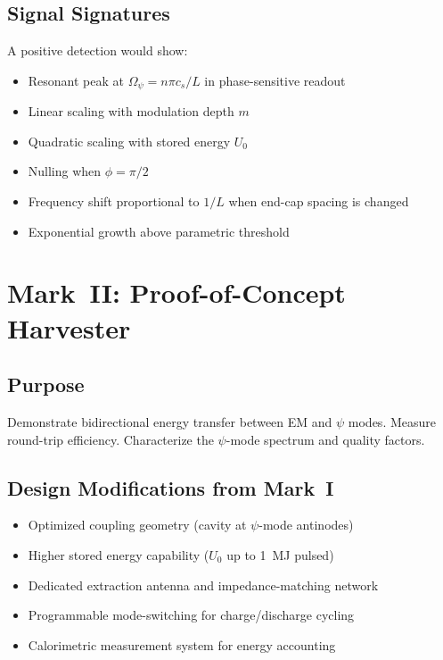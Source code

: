 \documentclass[11pt,a4paper]{article}
\begin{document}
\subsection{Signal Signatures}

A positive detection would show:
\begin{itemize}
\item Resonant peak at $\Omega_\psi = n\pi c_s/L$ in phase-sensitive readout
\item Linear scaling with modulation depth $m$
\item Quadratic scaling with stored energy $U_0$
\item Nulling when $\phi = \pi/2$
\item Frequency shift proportional to $1/L$ when end-cap spacing is changed
\item Exponential growth above parametric threshold
\end{itemize}

\section{Mark~II: Proof-of-Concept Harvester}

\subsection{Purpose}

Demonstrate bidirectional energy transfer between EM and $\psi$ modes.
Measure round-trip efficiency.  Characterize the $\psi$-mode spectrum
and quality factors.

\subsection{Design Modifications from Mark~I}

\begin{itemize}
\item Optimized coupling geometry (cavity at $\psi$-mode antinodes)
\item Higher stored energy capability ($U_0$ up to 1~MJ pulsed)
\item Dedicated extraction antenna and impedance-matching network
\item Programmable mode-switching for charge/discharge cycling
\item Calorimetric measurement system for energy accounting
\end{itemize}
\end{document}
